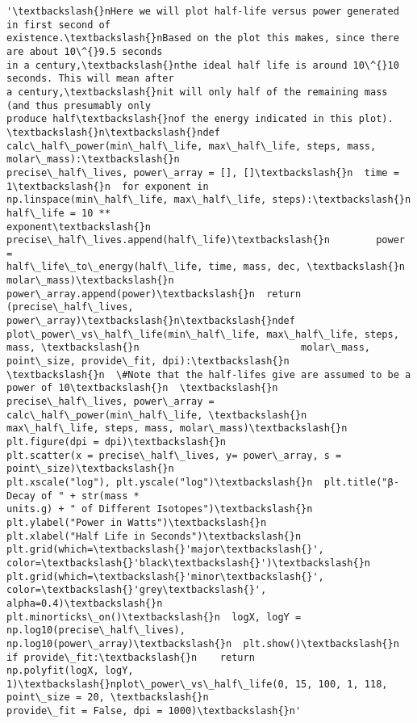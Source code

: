 \documentclass[11pt]{article}
\makeatletter
\newcommand{\boxspacing}{\kern\kvtcb@left@rule\kern\kvtcb@boxsep}
\newcommand{\prompt}[4]{
        \ttfamily\llap{{\color{#2}[#3]:\hspace{3pt}#4}}\vspace{-\baselineskip}
    }
\makeatother
\begin{document}
            \begin{tcolorbox}[breakable, size=fbox, boxrule=.5pt, pad at break*=1mm, opacityfill=0]
\prompt{Out}{outcolor}{367}{\boxspacing}
\begin{Verbatim}[commandchars=\\\{\}]
'\textbackslash{}nHere we will plot half-life versus power generated in first second of
existence.\textbackslash{}nBased on the plot this makes, since there are about 10\^{}9.5 seconds
in a century,\textbackslash{}nthe ideal half life is around 10\^{}10 seconds. This will mean after
a century,\textbackslash{}nit will only half of the remaining mass (and thus presumably only
produce half\textbackslash{}nof the energy indicated in this plot). \textbackslash{}n\textbackslash{}ndef
calc\_half\_power(min\_half\_life, max\_half\_life, steps, mass, molar\_mass):\textbackslash{}n
precise\_half\_lives, power\_array = [], []\textbackslash{}n  time = 1\textbackslash{}n  for exponent in
np.linspace(min\_half\_life, max\_half\_life, steps):\textbackslash{}n        half\_life = 10 **
exponent\textbackslash{}n        precise\_half\_lives.append(half\_life)\textbackslash{}n        power =
half\_life\_to\_energy(half\_life, time, mass, dec, \textbackslash{}n
molar\_mass)\textbackslash{}n        power\_array.append(power)\textbackslash{}n  return (precise\_half\_lives,
power\_array)\textbackslash{}n\textbackslash{}ndef plot\_power\_vs\_half\_life(min\_half\_life, max\_half\_life, steps,
mass, \textbackslash{}n                            molar\_mass, point\_size, provide\_fit, dpi):\textbackslash{}n
\textbackslash{}n  \#Note that the half-lifes give are assumed to be a power of 10\textbackslash{}n  \textbackslash{}n
precise\_half\_lives, power\_array = calc\_half\_power(min\_half\_life, \textbackslash{}n
max\_half\_life, steps, mass, molar\_mass)\textbackslash{}n  plt.figure(dpi = dpi)\textbackslash{}n
plt.scatter(x = precise\_half\_lives, y= power\_array, s = point\_size)\textbackslash{}n
plt.xscale("log"), plt.yscale("log")\textbackslash{}n  plt.title("β- Decay of " + str(mass *
units.g) + " of Different Isotopes")\textbackslash{}n  plt.ylabel("Power in Watts")\textbackslash{}n
plt.xlabel("Half Life in Seconds")\textbackslash{}n  plt.grid(which=\textbackslash{}'major\textbackslash{}',
color=\textbackslash{}'black\textbackslash{}')\textbackslash{}n  plt.grid(which=\textbackslash{}'minor\textbackslash{}', color=\textbackslash{}'grey\textbackslash{}', alpha=0.4)\textbackslash{}n
plt.minorticks\_on()\textbackslash{}n  logX, logY = np.log10(precise\_half\_lives),
np.log10(power\_array)\textbackslash{}n  plt.show()\textbackslash{}n  if provide\_fit:\textbackslash{}n    return
np.polyfit(logX, logY, 1)\textbackslash{}nplot\_power\_vs\_half\_life(0, 15, 100, 1, 118,
point\_size = 20, \textbackslash{}n                        provide\_fit = False, dpi = 1000)\textbackslash{}n'
\end{Verbatim}
\end{tcolorbox}
        
\end{document}
